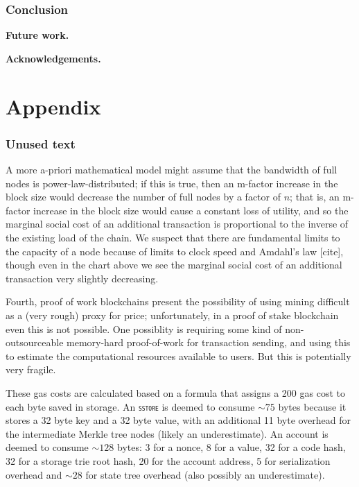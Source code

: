 \documentclass[12pt, final]{article}
\newcommand{\opcode}[1]{\textsc{\texttt{#1}}}
\begin{document}
\section{Conclusion}


\textbf{Future work.} 

\textbf{Acknowledgements.} 





\newpage
\appendix
\part*{Appendix}

\section{Unused text}



A more a-priori mathematical model might assume that the bandwidth of full nodes is power-law-distributed; if this is true, then an m-factor increase in the block size would decrease the number of full nodes by a factor of $n$; that is, an m-factor increase in the block size would cause a constant loss of utility, and so the marginal social cost of an additional transaction is proportional to the inverse of the existing load of the chain. We suspect that there are fundamental limits to the capacity of a node because of limits to clock speed and Amdahl's law [cite], though even in the chart above we see the marginal social cost of an additional transaction very slightly decreasing. 


Fourth, proof of work blockchains present the possibility of using mining difficult as a (very rough) proxy for price; unfortunately, in a proof of stake blockchain even this is not possible.  One possiblity is requiring some kind of non-outsourceable memory-hard proof-of-work for transaction sending, and using this to estimate the computational resources available to users.  But this is potentially very fragile.


These gas costs are calculated based on a formula that assigns a 200 gas cost to each byte saved in storage. An \opcode{sstore} is deemed to consume $\sim\!75$ bytes because it stores a 32 byte key and a 32 byte value, with an additional 11 byte overhead for the intermediate Merkle tree nodes (likely an underestimate). An account is deemed to consume $\sim\!128$ bytes: 3 for a nonce, 8 for a value, 32 for a code hash, 32 for a storage trie root hash, 20 for the account address, 5 for serialization overhead and $\sim\!28$ for state tree overhead (also possibly an underestimate). 
\end{document}
